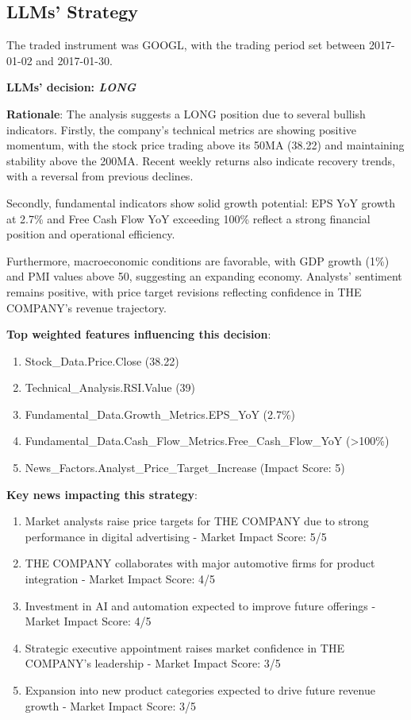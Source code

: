 \documentclass[8pt]{scrartcl}
\begin{document}
\newpage

\subsection*{LLMs' Strategy} \label{strategy8}

The traded instrument was GOOGL, with the trading period set between 2017-01-02 and 2017-01-30.

\textbf{LLMs' decision: \textit{LONG}}

\textbf{Rationale}: The analysis suggests a LONG position due to several bullish indicators. Firstly, the company’s technical metrics are showing positive momentum, with the stock price trading above its 50MA (38.22) and maintaining stability above the 200MA. Recent weekly returns also indicate recovery trends, with a reversal from previous declines.

Secondly, fundamental indicators show solid growth potential: EPS YoY growth at 2.7\% and Free Cash Flow YoY exceeding 100\% reflect a strong financial position and operational efficiency.

Furthermore, macroeconomic conditions are favorable, with GDP growth (1\%) and PMI values above 50, suggesting an expanding economy. Analysts’ sentiment remains positive, with price target revisions reflecting confidence in THE COMPANY’s revenue trajectory.

\textbf{Top weighted features influencing this decision}:
\begin{enumerate}
    \item Stock\_Data.Price.Close (38.22)
    \item Technical\_Analysis.RSI.Value (39)
    \item Fundamental\_Data.Growth\_Metrics.EPS\_YoY (2.7\%)
    \item Fundamental\_Data.Cash\_Flow\_Metrics.Free\_Cash\_Flow\_YoY (>100\%)
    \item News_Factors.Analyst\_Price\_Target\_Increase (Impact Score: 5)
\end{enumerate}

\textbf{Key news impacting this strategy}:
\begin{enumerate}
    \item Market analysts raise price targets for THE COMPANY due to strong performance in digital advertising - Market Impact Score: 5/5
    \item THE COMPANY collaborates with major automotive firms for product integration - Market Impact Score: 4/5
    \item Investment in AI and automation expected to improve future offerings - Market Impact Score: 4/5
    \item Strategic executive appointment raises market confidence in THE COMPANY’s leadership - Market Impact Score: 3/5
    \item Expansion into new product categories expected to drive future revenue growth - Market Impact Score: 3/5
\end{enumerate}
\end{document}
